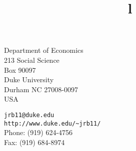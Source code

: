 \documentclass[margin,line,11pt,final]{res}
\begin{document}


\begin{resume}

\hspace{-0cm}
\begin{minipage}{1.25\linewidth}
  \begin{minipage}{0.45\linewidth}
    Department of Economics\\
    213 Social Science \\
    Box 90097 \\
    Duke University \\
    Durham NC 27008-0097 \\
    USA
  \end{minipage}
  \hspace{\fill}
  \begin{minipage}{0.55\linewidth}
    {\tt jrb11@duke.edu} \\
    {\tt \verb+http://www.duke.edu/~jrb11/+} \\
    Phone: (919) 624-4756 \\
    Fax: (919) 684-8974
  \end{minipage}
\end{minipage}

\begin{format}
\title{l}\\
\\
\body\\
\end{format}


\end{resume}
\end{document}
